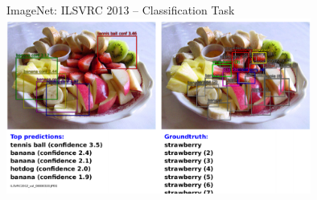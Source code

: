 \documentclass{beamer}
\begin{document}
\begin{frame}{ImageNet: ILSVRC 2013 -- Classification Task}
    \centering
    \includegraphics[width=0.75\textwidth]{overfeat.png}

    \vspace{-7mm}

\end{frame}

%
%
%
%
\end{document}
